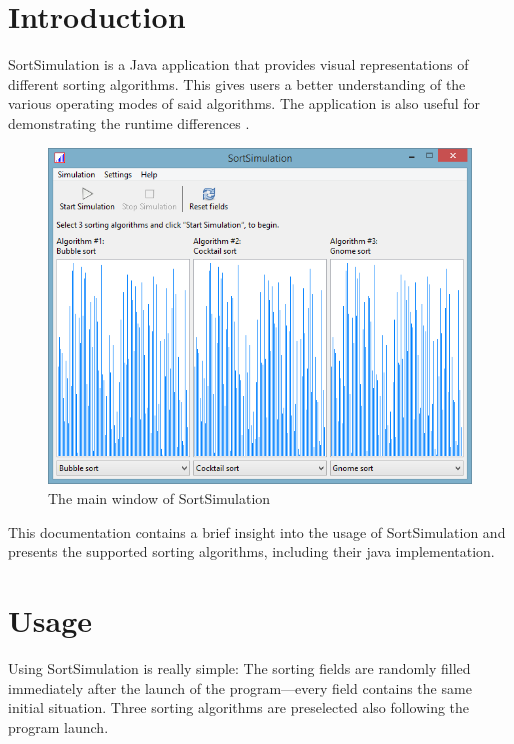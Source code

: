 \documentclass[]{pfBook}
\begin{document}
	\maketitlepage
	\cleardoublepage
	\maketableofcontents
	\cleardoublepage
	
	\section{Introduction}
	
	SortSimulation is a Java application that provides visual representations of different sorting algorithms. This gives users a better understanding of the various operating modes of said algorithms. The application is also useful for demonstrating the runtime differences .
	
	\begin{figure}[h]
		\centering
		\includegraphics[scale=0.6]{images/image0.png}
		\caption{The main window of SortSimulation}
	\end{figure}
	
	This documentation contains a brief insight into the usage of SortSimulation and presents the supported sorting algorithms, including their java implementation.
	
	\section{Usage}
	
	Using SortSimulation is really simple: The sorting fields are randomly filled immediately after the launch of the program---every field contains the same initial situation. Three sorting algorithms are preselected also following the program launch.
	
\end{document}
